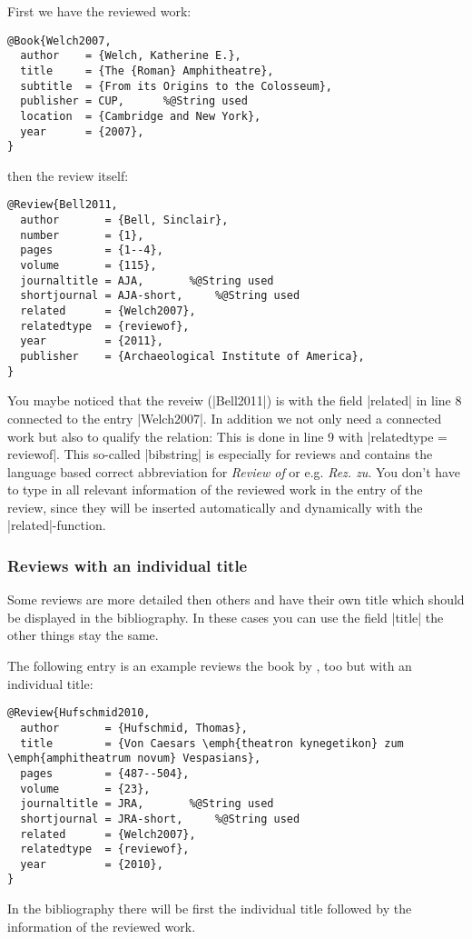 \documentclass[a4paper,
10pt,
greek,
french,
spanish,
italian,
ngerman,
english
]{ltxdoc}
\begin{document}
First we have the reviewed work:
\begin{lstlisting}[style=bibentry,label=Welch2007,caption={{@}Book\{Welch2007,…\} }]
@Book{Welch2007,
  author    = {Welch, Katherine E.},
  title     = {The {Roman} Amphitheatre},
  subtitle  = {From its Origins to the Colosseum},
  publisher = CUP,		%@String used
  location  = {Cambridge and New York},
  year      = {2007},
}
\end{lstlisting}
then the review itself:
\begin{lstlisting}[style=bibentry,label=Bell2011,caption={{@}Review\{Bell2011,…\} }]
@Review{Bell2011,
  author       = {Bell, Sinclair},
  number       = {1},
  pages        = {1--4},
  volume       = {115},
  journaltitle = AJA,		%@String used
  shortjournal = AJA-short,		%@String used
  related      = {Welch2007},
  relatedtype  = {reviewof},
  year         = {2011},
  publisher    = {Archaeological Institute of America},
}
\end{lstlisting}
You maybe noticed that the reveiw (|Bell2011|) is with the field |related| in line 8 connected to the entry |Welch2007|.
In addition we not only need a connected work but also to qualify the relation:
This is done in line 9 with |relatedtype = {reviewof}|.
This so-called |bibstring| is especially for reviews and contains the language based correct abbreviation for \emph{Review of} or e.g. \emph{Rez. zu}.
You don’t have to type in all relevant information of the reviewed work in the entry of the review, 
since they will be inserted automatically and dynamically with the  |related|-function.


\subsubsection{Reviews with an individual title}
Some reviews are more detailed then others and  have their own title which should be displayed in the bibliography.
In these cases you can use the field |title| the other things stay the same.

The following entry is an example reviews the book by \citeauthor*{Welch2007}, too but with an individual title:
\begin{lstlisting}[style=bibentry,label=Hufschmid2010,caption={{@}Review\{Hufschmid2010,…\} }]
@Review{Hufschmid2010,
  author       = {Hufschmid, Thomas},
  title        = {Von Caesars \emph{theatron kynegetikon} zum \emph{amphitheatrum novum} Vespasians},
  pages        = {487--504},
  volume       = {23},
  journaltitle = JRA,		%@String used
  shortjournal = JRA-short,		%@String used
  related      = {Welch2007},
  relatedtype  = {reviewof},
  year         = {2010},
}
\end{lstlisting}
In the bibliography there will be first the individual title followed by the information of the reviewed work.
\end{document}
